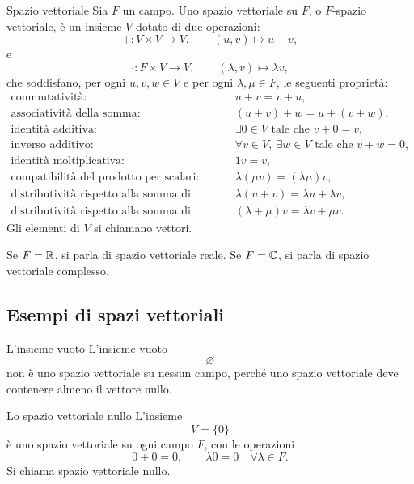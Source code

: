 \documentclass[a4paper]{article}
\begin{document}
\begin{snippetdefinition}{Spazio vettoriale}
    Sia \(F\) un campo. Uno spazio vettoriale su \(F\), o \(F\)-spazio vettoriale, è un insieme \(V\) dotato di due operazioni:
    \[
        + : V\times V\to V,
        \qquad
        (u,v)\mapsto u+v,
    \]
    e
    \[
        \cdot : F\times V\to V,
        \qquad
        (\lambda,v)\mapsto \lambda v,
    \]
    che soddisfano, per ogni \(u,v,w\in V\) e per ogni \(\lambda,\mu\in F\), le seguenti proprietà:
    \[
        \begin{array}{ll}
            \text{commutatività:} & u+v=v+u,\\[1mm]
            \text{associatività della somma:} & (u+v)+w=u+(v+w),\\[1mm]
            \text{identità additiva:} & \exists 0\in V \text{ tale che } v+0=v,\\[1mm]
            \text{inverso additivo:} & \forall v\in V,\ \exists w\in V \text{ tale che } v+w=0,\\[1mm]
            \text{identità moltiplicativa:} & 1v=v,\\[1mm]
            \text{compatibilità del prodotto per scalari:} & \lambda(\mu v)=(\lambda\mu)v,\\[1mm]
            \text{distributività rispetto alla somma di vettori:} & \lambda(u+v)=\lambda u+\lambda v,\\[1mm]
            \text{distributività rispetto alla somma di scalari:} & (\lambda+\mu)v=\lambda v+\mu v.
        \end{array}
    \]
    Gli elementi di \(V\) si chiamano vettori.
\end{snippetdefinition}

Se \(F=\mathbb{R}\), si parla di spazio vettoriale reale. Se \(F=\mathbb{C}\), si parla di spazio vettoriale complesso.

\subsection{Esempi di spazi vettoriali}

\begin{snippetexample}{L'insieme vuoto}
    L'insieme vuoto
    \[
        \varnothing
    \]
    non è uno spazio vettoriale su nessun campo, perché uno spazio vettoriale deve contenere almeno il vettore nullo.
\end{snippetexample}

\begin{snippetexample}{Lo spazio vettoriale nullo}
    L'insieme
    \[
        V=\{0\}
    \]
    è uno spazio vettoriale su ogni campo \(F\), con le operazioni
    \[
        0+0=0,
        \qquad
        \lambda 0=0
        \quad
        \forall \lambda\in F.
    \]
    Si chiama spazio vettoriale nullo.
\end{snippetexample}
\end{document}
